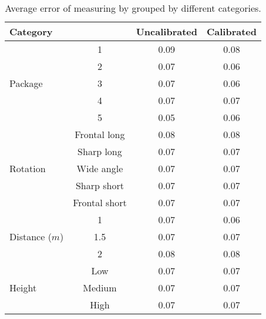 \begin{table}%
\centering
\begin{tabular}{lccc}
\toprule
\multicolumn{2}{l}{Category} & Uncalibrated & Calibrated\\
\midrule

\multirow{5}{*}{Package} 
& 1 & 0.09 & 0.08 \\
& 2 & 0.07 & 0.06 \\
& 3 & 0.07 & 0.06 \\
& 4 & 0.07 & 0.07 \\
& 5 & 0.05 & 0.06 \\
\midrule

\multirow{5}{*}{Rotation}
& Frontal long	& 0.08 & 0.08 \\\ 
& Sharp long	& 0.07 & 0.07 \\
& Wide angle 	& 0.07 & 0.07 \\
& Sharp short 	& 0.07 & 0.07 \\
& Frontal short	& 0.07 & 0.07 \\
\midrule
\multirow{3}{*}{Distance ($m$)} 
& 1 			& 0.07 & 0.06 \\
& 1.5  			& 0.07 & 0.07 \\
& 2 			& 0.08 & 0.08 \\
\midrule
\multirow{3}{*}{Height} 
& Low 		& 0.07 & 0.07 \\ 
& Medium 	& 0.07 & 0.07 \\
& High		& 0.07 & 0.07 \\
\bottomrule
 \end{tabular}
 \caption{Average error of measuring by grouped by different categories.}
\label{table:measuring_categories_error}
\end{table}
